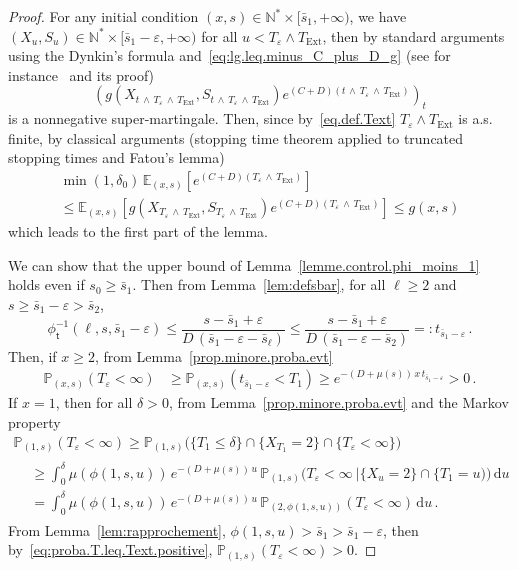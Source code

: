 \documentclass[AHL,Unicode,longabstracts,published]{cedram}
\newcommand{\PP}{\mathbb{P}}
\newcommand{\NN}{\mathbb{N}}
\newcommand{\EE}{\mathbb{E}}
\newcommand{\dif}{\mathrm{d}}
\newcommand{\phit}{\phi_\textsf{t}^{-1}}
\newcommand{\Text}{T_{\mathrm{Ext}}}
\newcommand{\1}{\mathbf{1}}
\begin{document}
\begin{proof}
For any initial condition $(x,s) \in \NN^* \times [\bar s_1, +\infty)$, we have $(X_u,S_u)\in \NN^*\times [\bar s_1-\varepsilon,+\infty)$ for all $u<T_\varepsilon\wedge \Text$, then by standard arguments using the Dynkin's formula and~\eqref{eq:lg.leq.minus_C_plus_D_g} (see for instance~\cite[Theorem~2.1]{MTIII} and its proof)
\[
\left(g\left(X_{t\,\wedge\, T_\varepsilon\,\wedge \,\Text},S_{t\,\wedge\,T_\varepsilon\,\wedge\,\Text}\right)e^{(C+D)\left(t\,\wedge \,T_\varepsilon\,\wedge\,\Text\right)}\right)_t
\]
is a nonnegative super-martingale. Then, since by~\eqref{eq.def.Text} $T_\varepsilon\wedge \Text$ is a.s. finite, by classical arguments (stopping time theorem applied to truncated stopping times and Fatou's lemma)
\begin{multline*}
\min(1,\delta_0)\,\EE_{(x,s)}\left[e^{(C+D) (T_\varepsilon\,\wedge\, \Text)} \right] \\
\leq \EE_{(x,s)}\left[g\left(X_{T_\varepsilon\,\wedge\,\Text},S_{T_\varepsilon\,\wedge\,\Text}\right) e^{(C+D) \left(T_\varepsilon\,\wedge\,\Text\right)} \right] \leq g(x,s)
\end{multline*}
which leads to the first part of the lemma.



We can show that the upper bound of Lemma~\ref{lemme.control.phi_moins_1} holds even if $s_0\geq \bar s_1$. Then from Lemma~\ref{lem:defsbar}, for all $\ell \geq 2$ and $s\geq \bar s_1-\varepsilon>\bar s_2$,
\[
\phit(\ell,s,\bar s_1-\varepsilon) \leq \frac{s-\bar s_1+\varepsilon}{D\,(\bar s_1-\varepsilon-\bar s_\ell)}\leq \frac{s-\bar s_1+\varepsilon}{D\,(\bar s_1-\varepsilon-\bar s_2)}=:t_{\bar s_1-\varepsilon}\,.
\]
Then, if $x\geq 2$, from Lemma~\ref{prop.minore.proba.evt}
\begin{align}\label{eq:proba.T.leq.Text.positive}
\PP_{(x,s)}(T_\varepsilon<\infty) &
\geq \PP_{(x,s)}(t_{\bar s_1-\varepsilon}<T_1) \geq e^{-(D+\mu(s))\,x\,t_{\bar s_1-\varepsilon}}>0\,.
\end{align}
If $x=1$, then for all $\delta>0$, from Lemma~\ref{prop.minore.proba.evt} and the Markov property
\begin{multline*}
\PP_{(1,s)}(T_\varepsilon<\infty)  \geq \PP_{(1,s)}\big(\{T_1\leq \delta\} \cap \{X_{T_1}=2\} \cap \{T_\varepsilon<\infty\}\big)
\\
\begin{aligned}
&\geq \int_0^{\delta}
\mu\left(\phi(1,s,u)\right)\, e^{-(D+\mu(s))\,u}\,
\PP_{(1,s)}
\Big(T_\varepsilon<\infty \ \Big| \{X_u=2\}\cap\{T_1=u) \Big)\,\dif u
\\
&= \int_0^{\delta}
\mu\left(\phi(1,s,u)\right)\, e^{-(D+\mu(s))\,u}\,
\PP_{(2,\phi(1,s,u))} (T_\varepsilon<\infty)\,\dif u\,.
\end{aligned}
\end{multline*}
From Lemma~\ref{lem:rapprochement}, $\phi(1,s,u)>\bar s_1>\bar s_1-\varepsilon$, then by~\eqref{eq:proba.T.leq.Text.positive}, $\PP_{(1,s)}(T_\varepsilon<\infty) >0$.
\end{proof}
\end{document}

